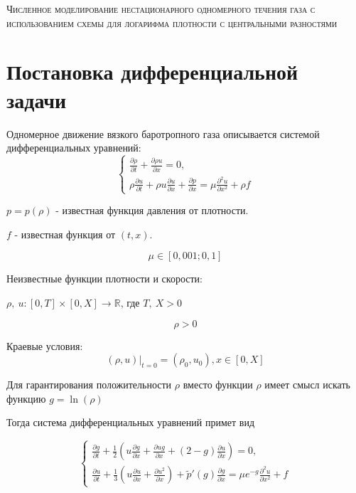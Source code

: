 \documentclass[11pt]{article}
\begin{document}
\begin{center}

\textsc{Численное моделирование нестационарного 
    одномерного течения газа с использованием схемы 
    для логарифма плотности с центральными разностями}

\end{center}

\enlargethispage{9\baselineskip}

\section{Постановка дифференциальной задачи}
Одномерное движение вязкого баротропного газа описывается системой дифференциальных уравнений:
$$
\begin{cases} 
\displaystyle{\frac{\partial \rho}{\partial t} +
 \frac{\partial \rho u}{\partial x} = 0}, \\

\displaystyle{\rho \frac{\partial u}{\partial t} +
 \rho u \frac{\partial u}{\partial x}+ 
 \frac{\partial p}{\partial x} = 
\mu \frac{\partial^2 u}{\partial x^2}
+ \rho f}
\end{cases}
$$

\begin{center}
$
p = p (\rho)
$ - известная функция давления от плотности. 

$f$ - известная функция от $(t, x)$.
\end{center}
$$\mu \in [0,001; 0,1]$$

Неизвестные функции плотности и скорости:

\begin{center}
$\rho,\ u: [0, T] \times [0, X] \rightarrow \mathbb{R}$, где $T,\ X > 0$
\end{center}

$$\rho > 0$$

Краевые условия:
$$(\rho, u)|_{t=0} = (\rho_0, u_0), x \in [0, X]$$

Для гарантирования положительности $\rho$ вместо функции $\rho$ имеет смысл искать функцию $g = \ln(\rho)$ 

Тогда система дифференциальных уравнений примет вид

$$
\begin{cases}
\displaystyle{\frac{\partial g}{\partial t} + \frac{1}{2} \left(u\frac{\partial g}{\partial x} +     \frac{\partial ug}{\partial x} +(2-g)\frac{\partial u}{\partial x}\right) = 0},\\
\displaystyle{\frac{\partial u}
{\partial t} + \frac{1}{3} \left(u 
\frac{\partial u}{\partial x} +
 \frac{\partial u^2}{\partial x}\right) +
  \tilde{p}'(g)
 \frac{\partial g}{\partial x} = \mu
  e^{-g}\frac{\partial^2 u}{\partial x^2} +
   f}
\end{cases}
$$
\end{document}
